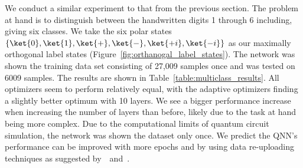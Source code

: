 \documentclass[a4paper,10pt]{article}
\begin{document}
We conduct a similar experiment to that from the previous section.
The problem at hand is to distinguish between the handwritten digits 1 through 6 including, giving six classes.
We take the six polar states $\{\ket{0}, \ket{1}, \ket{+}, \ket{-}, \ket{+i}, \ket{-i}\}$ as our maximally orthogonal label states (Figure~\ref{fig:orthanogal_label_states}).
The network was shown the training data set consisting of 27,009 samples once and was tested on 6009 samples.
The results are shown in Table~\ref{table:multiclass_results}.
All optimizers seem to perform relatively equal, with the adaptive optimizers finding a slightly better optimum with 10 layers.
We see a bigger performance increase when increasing the number of layers than before, likely due to the task at hand being more complex.
Due to the computational limits of quantum circuit simulation, the network was shown the dataset only once.
We predict the QNN's performance can be improved with more epochs and by using data re-uploading techniques as suggested by~\textcite{vidal2019input}~and~\textcite{perez2019data}.
\end{document}
